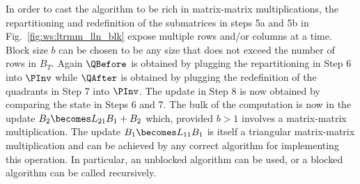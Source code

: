 In order to cast the algorithm to be rich in matrix-matrix
multiplications, the repartitioning and redefinition of the
submatrices in steps 5a and 5b in Fig.~\ref{fig:ws:ltrmm_lln_blk}
expose multiple rows and/or columns at a time.  Block size $ b $ can
be chosen to be any size that does not exceed the number of rows in $
B_T $.  Again $ \QBefore $ is obtained by plugging the repartitioning
in Step 6 into $ \PInv $ while $ \QAfter $ is obtained by plugging the
redefinition of the quadrants in Step 7 into $ \PInv $.  The update in
Step 8 is now obtained by comparing the state in Steps 6 and 7.  The
bulk of the computation is now in the update $ B_2 \becomes L_{21} B_1
+ B_2 $ which, provided $ b > 1 $ involves a matrix-matrix
multiplication.  The update $ B_1 \becomes L_{11} B_1 $ is itself a
triangular matrix-matrix multiplication and can be achieved by any
correct algorithm for implementing this operation.  In particular, an
unblocked algorithm can be used, or a blocked algorithm can be called
recursively.


\renewcommand{\blocksize}{ b }
%

\renewcommand{\repartitionings}{
$ 
\FlaTwoByOne{ B_T }{ B_B } 
\rightarrow
\FlaThreeByOneT{ B_0 }{ B_1 }{ B_2 },
\FlaTwoByOne{ \hat{B}_T }{ \hat{B}_B } 
\rightarrow
\FlaThreeByOneT{ \hat{B}_0 }{ \hat{B}_1 }{ \hat{B}_2 },
$ \\
and
$ \FlaTwoByTwo{ L_{TL} }{ 0 }
            { L_{BL} }{ L_{BR} }
\rightarrow
\FlaThreeByThreeTL{ L_{00} }{ 0 }{ 0 }
                { L_{10} }{ L_{11} }{ 0 }
                { L_{20} }{ L_{21} }{ L_{22} }
$
}
%
\renewcommand{\repartitionsizes}{
$ B_1 $ and $ \hat{B}_1 $ have $ b $ rows
and $ L_{11} $ is $ b \times b $
}

\renewcommand{\moveboundaries}{%
$ 
\FlaTwoByOne{ B_T }{ B_B } 
\leftarrow
\FlaThreeByOneB{ B_0 }{ B_1 }{ B_2 },
\FlaTwoByOne{ \hat{B}_T }{ \hat{B}_B } 
\leftarrow
\FlaThreeByOneB{ \hat{B}_0 }{ \hat{B}_1 }{ \hat{B}_2 },
$ \\
and
$ \FlaTwoByTwo{ L_{TL} }{ 0 }
            { L_{BL} }{ L_{BR} }
\leftarrow
\FlaThreeByThreeBR{ L_{00} }{ 0 }{ 0 }
                { L_{10} }{ L_{11} }{ 0 }
                { L_{20} }{ L_{21} }{ L_{22} }
$
}

\renewcommand{\beforeupdate}{
\FlaTwoByOne{ 
\FlaTwoByOneSingleLine{ B_0 }{ B_1 }
}
{
B_2
} =
\FlaTwoByOne{ 
\FlaTwoByOneSingleLine{ \hat{B}_0 }{ \hat{B}_1 }
}
{
L_{22} \hat{B}_2
}
\wedge \ldots
}

